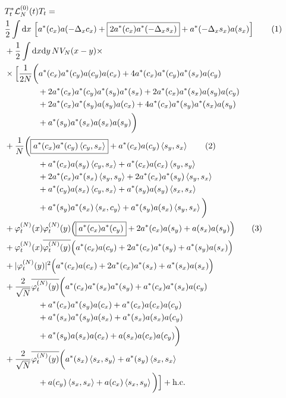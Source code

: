 \documentclass[11pt,a4paper,twoside,headsepline]{scrartcl}
\newcommand{\di}{\textrm{d}}		%
\newcommand{\Lcal}{\mathcal{L}}		%
\newcommand{\hc}{\mbox{h.c.}}		%
\newcommand{\scal}[2]{\left<#1,#2\right>} %
\newcommand{\cc}[1]{\overline{#1}}	%
\newcommand{\ph}{\varphi_t^{(N)}}	%
\newcommand{\tagg}[1]{ \stepcounter{equation} \tag{\theequation} \label{eq:#1} } %
\begin{document}
\begin{align*}
& T^*_t \Lcal_N^{(0)}(t) T_t = \\ 
& \frac{1}{2} \int \di x\, \left[ a^*(c_x) a(-\Delta_x c_x) + \boxed{2 a^*(c_x) a^*(-\Delta_x s_x)} + a^*(-\Delta_x s_x) a(s_x) \right] \tagg{cancellation_kinetic} \\
& + \frac{1}{2}\int \di x \di y\, NV_N(x-y) \times \\
& \times \Big[   \frac{1}{2N}\bigg( a^*(c_x) a^*(c_y) a(c_y) a(c_x) + 4 a^*(c_x) a^*(c_y) a^*(s_x) a(c_y) \\
				      & \qquad\qquad + 2 a^*(c_x) a^*(c_y) a^*(s_y) a^*(s_x) + 2 a^*(c_x) a^*(s_x) a(s_y) a(c_y) \\
				      & \qquad\qquad + 2 a^*(c_x) a^*(s_y) a(s_y) a(c_x) + 4 a^*(c_x) a^*(s_y) a^*(s_x) a(s_y) \\
				      & \qquad\qquad + a^*(s_y) a^*(s_x) a(s_x) a(s_y) \bigg) \\
& + \frac{1}{N}\bigg(   \boxed{a^*(c_x)a^*(c_y) \scal{c_y}{s_x}} + a^*(c_x) a(c_y) \scal{s_y}{s_x} \tagg{cancellation_normalorder} \\
			& \qquad\qquad + a^*(c_x) a(s_y) \scal{c_y}{s_x} + a^*(c_x) a(c_x) \scal{s_y}{s_y} \\
			& \qquad\qquad + 2 a^*(c_x) a^*(s_x) \scal{s_y}{s_y} + 2a^*(c_x)a^*(s_y) \scal{s_y}{s_x} \\
			& \qquad\qquad + a^*(c_y) a(s_x) \scal{c_y}{s_x} +  a^*(s_y) a(s_y) \scal{s_x}{s_x}\\
			& \qquad\qquad + a^*(s_y) a^*(s_x) \scal{s_x}{c_y} + a^*(s_y) a(s_x) \scal{s_y}{s_x}   \bigg) \\
& + \ph(x)\ph(y) \Big( \boxed{a^*(c_x) a^*(c_y)} + 2 a^*(c_x) a(s_y) +a(s_x) a(s_y) \Big) \tagg{cancellation_standard} \\
& + \ph(x) \cc{\ph(y)} \Big( a^*(c_x) a(c_y) + 2 a^*(c_x) a^*(s_y) + a^*(s_y) a(s_x) \Big) \\
& + \lvert \ph(y) \rvert^2 \Big( a^*(c_x) a(c_x) + 2 a^*(c_x) a^*(s_x) + a^*(s_x) a(s_x) \Big) \\
& + \frac{2}{\sqrt{N}}\cc{\ph(y)} \bigg(    a^*(c_x) a^*(s_x) a^*(s_y) + a^*(c_x) a^*(s_x) a(c_y) \\
					    & \qquad\qquad + a^*(c_x) a^*(s_y) a(c_x) + a^*(c_x) a(c_x) a(c_y) \\
					    & \qquad\qquad + a^*(s_x) a^*(s_y) a(s_x) + a^*(s_x) a(s_x) a(c_y) \\
					    & \qquad\qquad + a^*(s_y) a(s_x) a(c_x) + a(s_x) a(c_x) a(c_y)    \bigg) \\
& + \frac{2}{\sqrt{N}}\cc{\ph(y)} \bigg(    a^*(s_x) \scal{s_x}{s_y} + a^*(s_y) \scal{s_x}{s_x} \\
					    & \qquad\qquad + a(c_y) \scal{s_x}{s_x} + a(c_x) \scal{s_x}{s_y}   \bigg)    \Big] + \hc
\end{align*}
\end{document}
